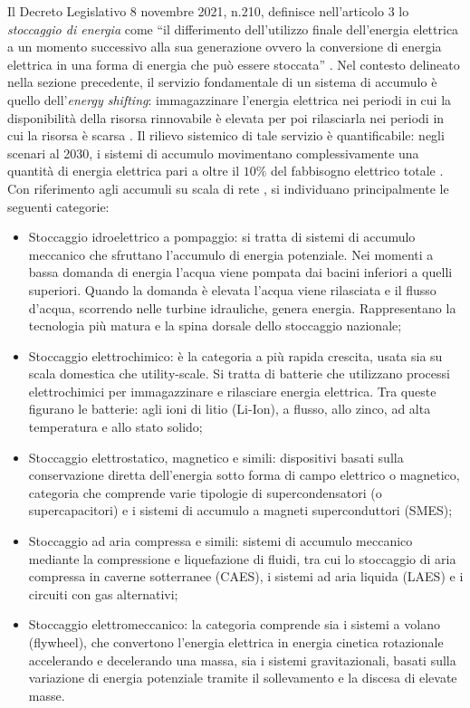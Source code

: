 Il Decreto Legislativo 8 novembre 2021, n.210, definisce nell'articolo $3$ lo \emph{stoccaggio di energia} come ``il differimento dell'utilizzo finale dell'energia elettrica a un momento successivo alla sua generazione ovvero la conversione di energia elettrica in una forma di energia che può essere stoccata'' \cite{dlgs210}. Nel contesto delineato nella sezione precedente, il servizio fondamentale di un sistema di accumulo è quello dell'\emph{energy shifting}:  immagazzinare l'energia elettrica nei periodi in cui la disponibilità della risorsa rinnovabile è elevata per poi rilasciarla nei periodi in cui la
risorsa è scarsa \cite{dds2024}. Il rilievo sistemico di tale servizio è quantificabile: negli scenari al 2030, i sistemi di accumulo movimentano complessivamente una quantità di energia elettrica pari a oltre il $10 \%$ del fabbisogno elettrico totale \cite{dds2024}. Con riferimento agli accumuli su scala di rete \cite{terna2023stoccaggio}, si individuano principalmente le seguenti categorie:
\begin{itemize}
    \item Stoccaggio idroelettrico a pompaggio: si tratta di sistemi di accumulo meccanico che sfruttano l'accumulo di energia potenziale. Nei momenti a bassa domanda di energia l'acqua viene pompata dai bacini inferiori a quelli superiori. Quando la domanda è elevata l'acqua viene rilasciata e il flusso d'acqua, scorrendo nelle turbine idrauliche, genera energia. Rappresentano la tecnologia più matura e la spina dorsale dello stoccaggio nazionale; 
    \item Stoccaggio elettrochimico: è la categoria a più rapida crescita, usata sia su scala domestica che utility-scale. Si tratta di batterie che utilizzano processi elettrochimici per immagazzinare e rilasciare energia elettrica. Tra queste figurano le batterie: agli ioni di litio (Li-Ion),
    a flusso, allo zinco, ad alta temperatura e allo stato solido;
    \item Stoccaggio elettrostatico, magnetico e simili: dispositivi basati sulla conservazione diretta dell'energia sotto forma di campo elettrico o magnetico, categoria che comprende varie tipologie di supercondensatori (o supercapacitori) e i sistemi di accumulo a magneti superconduttori (SMES);
    \item Stoccaggio ad aria compressa e simili: sistemi di accumulo meccanico mediante la compressione e liquefazione di fluidi, tra cui lo stoccaggio di aria compressa in caverne sotterranee (CAES), i sistemi ad aria liquida (LAES) e i circuiti con gas alternativi;
    \item Stoccaggio elettromeccanico: la categoria comprende sia i sistemi a volano (flywheel), che convertono l'energia elettrica in energia cinetica rotazionale accelerando e decelerando una massa, sia i sistemi gravitazionali, basati sulla variazione di energia potenziale tramite il sollevamento e la discesa di elevate masse.
\end{itemize}

